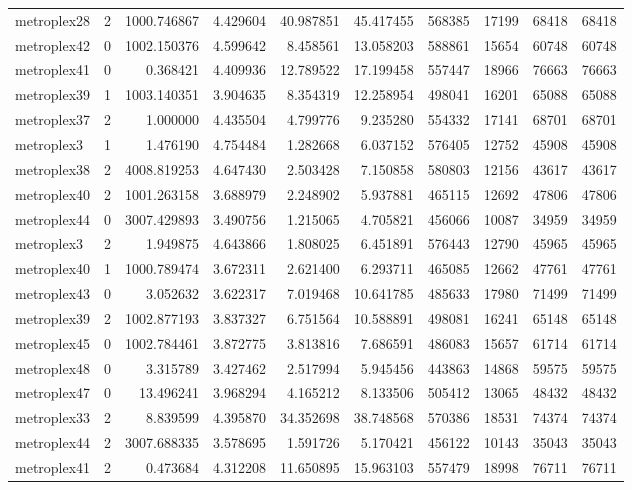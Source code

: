 \documentclass[../../../thesis.tex]{subfiles}
\begin{document}
\begin{longtable}{|l|r|r|r|r|r|r|r|r|r|}
metroplex28 & 2 & 1000.746867 & 4.429604 & 40.987851 & 45.417455 & 568385 & 17199 & 68418 & 68418 \\
metroplex42 & 0 & 1002.150376 & 4.599642 & 8.458561 & 13.058203 & 588861 & 15654 & 60748 & 60748 \\
metroplex41 & 0 & 0.368421 & 4.409936 & 12.789522 & 17.199458 & 557447 & 18966 & 76663 & 76663 \\
metroplex39 & 1 & 1003.140351 & 3.904635 & 8.354319 & 12.258954 & 498041 & 16201 & 65088 & 65088 \\
metroplex37 & 2 & 1.000000 & 4.435504 & 4.799776 & 9.235280 & 554332 & 17141 & 68701 & 68701 \\
metroplex3 & 1 & 1.476190 & 4.754484 & 1.282668 & 6.037152 & 576405 & 12752 & 45908 & 45908 \\
metroplex38 & 2 & 4008.819253 & 4.647430 & 2.503428 & 7.150858 & 580803 & 12156 & 43617 & 43617 \\
metroplex40 & 2 & 1001.263158 & 3.688979 & 2.248902 & 5.937881 & 465115 & 12692 & 47806 & 47806 \\
metroplex44 & 0 & 3007.429893 & 3.490756 & 1.215065 & 4.705821 & 456066 & 10087 & 34959 & 34959 \\
metroplex3 & 2 & 1.949875 & 4.643866 & 1.808025 & 6.451891 & 576443 & 12790 & 45965 & 45965 \\
metroplex40 & 1 & 1000.789474 & 3.672311 & 2.621400 & 6.293711 & 465085 & 12662 & 47761 & 47761 \\
metroplex43 & 0 & 3.052632 & 3.622317 & 7.019468 & 10.641785 & 485633 & 17980 & 71499 & 71499 \\
metroplex39 & 2 & 1002.877193 & 3.837327 & 6.751564 & 10.588891 & 498081 & 16241 & 65148 & 65148 \\
metroplex45 & 0 & 1002.784461 & 3.872775 & 3.813816 & 7.686591 & 486083 & 15657 & 61714 & 61714 \\
metroplex48 & 0 & 3.315789 & 3.427462 & 2.517994 & 5.945456 & 443863 & 14868 & 59575 & 59575 \\
metroplex47 & 0 & 13.496241 & 3.968294 & 4.165212 & 8.133506 & 505412 & 13065 & 48432 & 48432 \\
metroplex33 & 2 & 8.839599 & 4.395870 & 34.352698 & 38.748568 & 570386 & 18531 & 74374 & 74374 \\
metroplex44 & 2 & 3007.688335 & 3.578695 & 1.591726 & 5.170421 & 456122 & 10143 & 35043 & 35043 \\
metroplex41 & 2 & 0.473684 & 4.312208 & 11.650895 & 15.963103 & 557479 & 18998 & 76711 & 76711 \\

\end{longtable}
\end{document}
